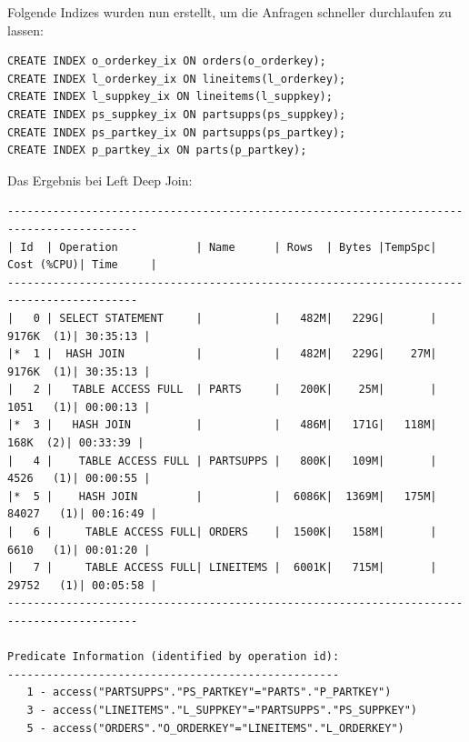 \documentclass[10pt]{article}
\begin{document}
Folgende Indizes wurden nun erstellt, um die Anfragen schneller durchlaufen zu lassen:
\begin{lstlisting}[style=sql]
CREATE INDEX o_orderkey_ix ON orders(o_orderkey);
CREATE INDEX l_orderkey_ix ON lineitems(l_orderkey);
CREATE INDEX l_suppkey_ix ON lineitems(l_suppkey);
CREATE INDEX ps_suppkey_ix ON partsupps(ps_suppkey);
CREATE INDEX ps_partkey_ix ON partsupps(ps_partkey);
CREATE INDEX p_partkey_ix ON parts(p_partkey);
\end{lstlisting}

\newpage
Das Ergebnis bei Left Deep Join:
\begin{lstlisting}[style=queryexecutionplan]
------------------------------------------------------------------------------------------
| Id  | Operation            | Name      | Rows  | Bytes |TempSpc| Cost (%CPU)| Time     |
------------------------------------------------------------------------------------------
|   0 | SELECT STATEMENT     |           |   482M|   229G|       |  9176K  (1)| 30:35:13 |
|*  1 |  HASH JOIN           |           |   482M|   229G|    27M|  9176K  (1)| 30:35:13 |
|   2 |   TABLE ACCESS FULL  | PARTS     |   200K|    25M|       |  1051   (1)| 00:00:13 |
|*  3 |   HASH JOIN          |           |   486M|   171G|   118M|   168K  (2)| 00:33:39 |
|   4 |    TABLE ACCESS FULL | PARTSUPPS |   800K|   109M|       |  4526   (1)| 00:00:55 |
|*  5 |    HASH JOIN         |           |  6086K|  1369M|   175M| 84027   (1)| 00:16:49 |
|   6 |     TABLE ACCESS FULL| ORDERS    |  1500K|   158M|       |  6610   (1)| 00:01:20 |
|   7 |     TABLE ACCESS FULL| LINEITEMS |  6001K|   715M|       | 29752   (1)| 00:05:58 |
------------------------------------------------------------------------------------------
 
Predicate Information (identified by operation id):
---------------------------------------------------
   1 - access("PARTSUPPS"."PS_PARTKEY"="PARTS"."P_PARTKEY")
   3 - access("LINEITEMS"."L_SUPPKEY"="PARTSUPPS"."PS_SUPPKEY")
   5 - access("ORDERS"."O_ORDERKEY"="LINEITEMS"."L_ORDERKEY")
\end{lstlisting}
\end{document}
